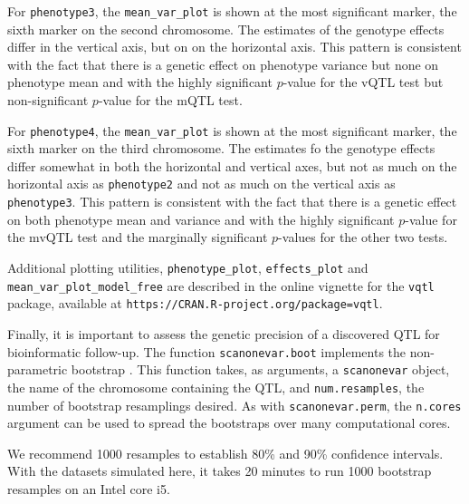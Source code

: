 \documentclass{article}
\begin{document}
For \texttt{phenotype3}, the \texttt{mean\_var\_plot} is shown at the most significant marker, the sixth marker on the second chromosome.
The estimates of the genotype effects differ in the vertical axis, but on on the horizontal axis.
This pattern is consistent with the fact that there is a genetic effect on phenotype variance but none on phenotype mean and with the highly significant $p$-value for the vQTL test but non-significant $p$-value for the mQTL test.

For \texttt{phenotype4}, the \texttt{mean\_var\_plot} is shown at the most significant marker, the sixth marker on the third chromosome.
The estimates fo the genotype effects differ somewhat in both the horizontal and vertical axes, but not as much on the horizontal axis as \texttt{phenotype2} and not as much on the vertical axis as \texttt{phenotype3}.
This pattern is consistent with the fact that there is a genetic effect on both phenotype mean and variance and with the highly significant $p$-value for the mvQTL test and the marginally significant $p$-values for the other two tests.

Additional plotting utilities, \texttt{phenotype\_plot}, \texttt{effects\_plot} and \texttt{mean\_var\_plot\_model\_free} are described in the online vignette for the \texttt{vqtl} package, available at \texttt{https://CRAN.R-project.org/package=vqtl}.


Finally, it is important to assess the genetic precision of a discovered QTL for bioinformatic follow-up.
The function \texttt{scanonevar.boot} implements the non-parametric bootstrap \cite{Visscher1996}.
This function takes, as arguments, a \texttt{scanonevar} object, the name of the chromosome containing the QTL, and \texttt{num.resamples}, the number of bootstrap resamplings desired.
As with \texttt{scanonevar.perm}, the \texttt{n.cores} argument can be used to spread the bootstraps over many computational cores.

We recommend 1000 resamples to establish 80\% and 90\% confidence intervals.
With the datasets simulated here, it takes 20 minutes to run 1000 bootstrap resamples on an Intel core i5.



\end{document}
